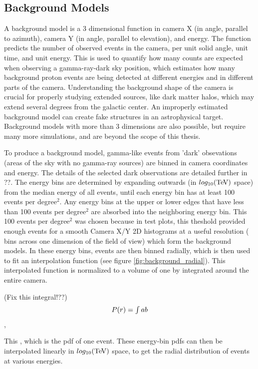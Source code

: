 \subsection{Background Models}\label{background_production}

A background model is a 3 dimensional function in camera X (in angle, parallel to azimuth), camera Y (in angle, parallel to elevation), and energy.
The function predicts the number of observed events in the camera, per unit solid angle, unit time, and unit energy.
This is used to quantify how many counts are expected when observing a gamma-ray-dark sky position, which estimates how many background proton events are being detected at different energies and in different parts of the camera.
Understanding the background shape of the camera is crucial for properly studying extended sources, like dark matter halos, which may extend several degrees from the galactic center.
An improperly estimated background model can create fake structures in an astrophysical target.
Background models with more than 3 dimensions are also possible, but require many more simulations, and are beyond the scope of this thesis.

To produce a background model, gamma-like events from 'dark' obsevations (areas of the sky with no gamma-ray sources) are binned in camera coordinates and energy.
The details of the selected dark observations are detailed further in ??.
The energy bins are determined by expanding outwards (in $log_{10}(\TeV )$ space) from the median energy of all events, until each energy bin has at least 100 events per degree$^2$.
Any energy bins at the upper or lower edges that have less than 100 events per degree$^2$ are absorbed into the neighboring energy bin.
This 100 events per degree$^2$ was chosen because in test plots, this theshold provided enough events for a smooth Camera X/Y 2D histograms at a useful resolution ( bins across one dimension of the field of view) which form the background models.
In these energy bins, events are then binned radially, which is then used to fit an interpolation function (see figure \ref{fig:background_radial}).
This interpolated function is normalized to a volume of one by integrated around the entire camera.

(Fix this integral!??)
\begin{equation} \label{eqn:background_integral}
$$ P(r) = \int{a}{b} $$
\end{equation},

This , which is the pdf of one event.
These energy-bin pdfs can then be interpolated linearly in $log_{10}(\TeV )$ space, to get the radial distribution of events at various energies.

